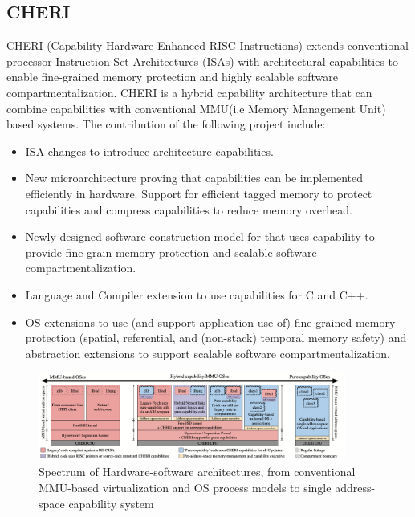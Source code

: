 
\subsection{CHERI \cite{CHERI}}
CHERI (Capability Hardware Enhanced RISC Instructions) extends conventional processor
Instruction-Set Architectures (ISAs) with architectural capabilities to enable fine-grained
memory protection and highly scalable software compartmentalization. CHERI is a hybrid 
capability architecture that can combine capabilities with conventional MMU(i.e Memory Management
 Unit) based systems. The contribution of the following project include: 
\begin{itemize}
  \item ISA changes to introduce architecture capabilities.
  \item New microarchitecture proving that capabilities can be implemented efficiently 
        in hardware. Support for efficient tagged memory to protect capabilities and
        compress capabilities to reduce memory overhead.   
  \item Newly designed software construction model for that uses capability to provide
        fine grain memory protection and scalable software compartmentalization.  
  \item Language and Compiler extension to use capabilities for C and C++.
  \item OS extensions to use (and support application use of) fine-grained memory protection
        (spatial, referential, and (non-stack) temporal memory safety) and abstraction extensions
        to support scalable software compartmentalization. 
\end{itemize}

\begin{figure}[htbp!] 
  \centering    
  \includegraphics[width=0.9\textwidth]{Cheri}
  \caption[Cheri]{Spectrum of Hardware-software architectures, from conventional MMU-based virtualization and OS process models to single address-space capability system \cite{CHERI}}
  \label{fig:Cheri}
  \end{figure}
	
